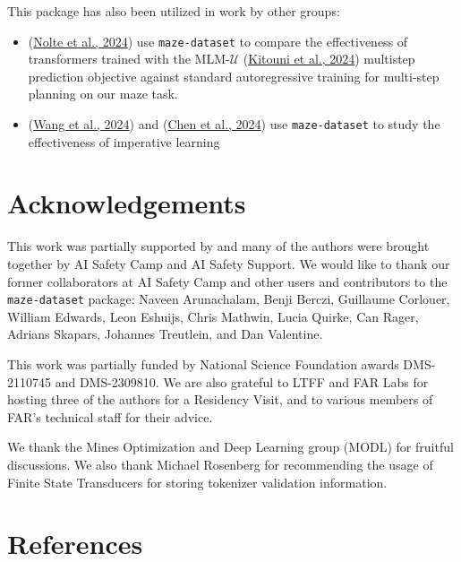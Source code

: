 \documentclass[10pt,a4paper,onecolumn]{article}
\begin{document}
This package has also been utilized in work by other groups:

\begin{itemize}
\item
  (\protect\hyperlink{ref-nolte2024multistep}{Nolte et al., 2024}) use
  \texttt{maze-dataset} to compare the effectiveness of transformers
  trained with the MLM-\(\mathcal{U}\)
  (\protect\hyperlink{ref-MLMU-kitouni2024factorization}{Kitouni et al.,
  2024}) multistep prediction objective against standard autoregressive
  training for multi-step planning on our maze task.
\item
  (\protect\hyperlink{ref-wang2024imperative}{Wang et al., 2024}) and
  (\protect\hyperlink{ref-chen2024iaimperative}{Chen et al., 2024}) use
  \texttt{maze-dataset} to study the effectiveness of imperative
  learning
\end{itemize}

\hypertarget{acknowledgements}{%
\section{Acknowledgements}\label{acknowledgements}}

This work was partially supported by and many of the authors were
brought together by AI Safety Camp and AI Safety Support. We would like
to thank our former collaborators at AI Safety Camp and other users and
contributors to the \texttt{maze-dataset} package: Naveen Arunachalam,
Benji Berczi, Guillaume Corlouer, William Edwards, Leon Eshuijs, Chris
Mathwin, Lucia Quirke, Can Rager, Adrians Skapars, Johannes Treutlein,
and Dan Valentine.

This work was partially funded by National Science Foundation awards
DMS-2110745 and DMS-2309810. We are also grateful to LTFF and FAR Labs
for hosting three of the authors for a Residency Visit, and to various
members of FAR's technical staff for their advice.

We thank the Mines Optimization and Deep Learning group (MODL) for
fruitful discussions. We also thank Michael Rosenberg for recommending
the usage of Finite State Transducers for storing tokenizer validation
information.

\hypertarget{references}{%
\section*{References}\label{references}}
\end{document}
